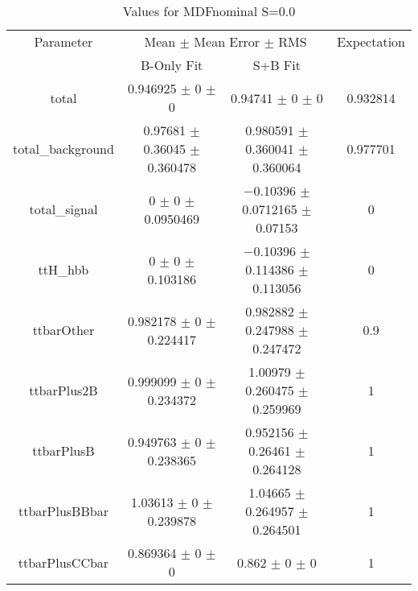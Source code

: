 \begin{table}
\centering
\caption{Values for MDFnominal S=0.0}
\begin{tabular}{cccc}
\toprule
Parameter & \multicolumn{2}{c}{Mean $\pm$ Mean Error $\pm$ RMS} & Expectation\\
 & B-Only Fit & S+B Fit & \\
\midrule
total & \num{0.946925} $\pm$ \num{0} $\pm$ \num{0} & \num{0.94741} $\pm$ \num{0} $\pm$ \num{0} & \num{0.932814}\\
total\_background & \num{0.97681} $\pm$ \num{0.36045} $\pm$ \num{0.360478} & \num{0.980591} $\pm$ \num{0.360041} $\pm$ \num{0.360064} & \num{0.977701}\\
total\_signal & \num{0} $\pm$ \num{0} $\pm$ \num{0.0950469} & \num{-0.10396} $\pm$ \num{0.0712165} $\pm$ \num{0.07153} & \num{0}\\
ttH\_hbb & \num{0} $\pm$ \num{0} $\pm$ \num{0.103186} & \num{-0.10396} $\pm$ \num{0.114386} $\pm$ \num{0.113056} & \num{0}\\
ttbarOther & \num{0.982178} $\pm$ \num{0} $\pm$ \num{0.224417} & \num{0.982882} $\pm$ \num{0.247988} $\pm$ \num{0.247472} & \num{0.9}\\
ttbarPlus2B & \num{0.999099} $\pm$ \num{0} $\pm$ \num{0.234372} & \num{1.00979} $\pm$ \num{0.260475} $\pm$ \num{0.259969} & \num{1}\\
ttbarPlusB & \num{0.949763} $\pm$ \num{0} $\pm$ \num{0.238365} & \num{0.952156} $\pm$ \num{0.26461} $\pm$ \num{0.264128} & \num{1}\\
ttbarPlusBBbar & \num{1.03613} $\pm$ \num{0} $\pm$ \num{0.239878} & \num{1.04665} $\pm$ \num{0.264957} $\pm$ \num{0.264501} & \num{1}\\
ttbarPlusCCbar & \num{0.869364} $\pm$ \num{0} $\pm$ \num{0} & \num{0.862} $\pm$ \num{0} $\pm$ \num{0} & \num{1}\\
\bottomrule
\end{tabular}
\end{table}